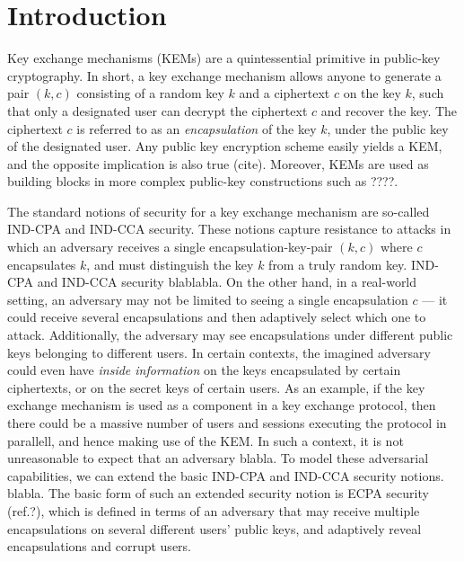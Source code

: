 
\section{Introduction}

Key exchange mechanisms (KEMs) are a quintessential primitive in public-key cryptography.
In short, a key exchange mechanism allows anyone to generate a pair \((k,c)\)
consisting of a random key \(k\) and a ciphertext \(c\) on the key \(k\),
such that only a designated user can decrypt the ciphertext \(c\) and recover the key.
The ciphertext \(c\) is referred to as an \emph{encapsulation} of the key \(k\),
under the public key of the designated user.
Any public key encryption scheme easily yields a KEM, and the opposite implication is also true (cite).
Moreover, KEMs are used as building blocks in more complex public-key constructions such as ????.

The standard notions of security for a key exchange mechanism are so-called IND-CPA and IND-CCA security.
These notions capture resistance to attacks in which an adversary receives a single
encapsulation-key-pair \((k,c)\) where \(c\) encapsulates \(k\),
and must distinguish the key \(k\) from a truly random key.
IND-CPA and IND-CCA security blablabla.
On the other hand, in a real-world setting,
an adversary may not be limited to seeing a single encapsulation \(c\)
--- it could receive several encapsulations and then adaptively select which one to attack.
Additionally, the adversary may see encapsulations under different public keys belonging to different users.
In certain contexts, the imagined adversary could even have \emph{inside information}
on the keys encapsulated by certain ciphertexts, or on the secret keys of certain users.
As an example, if the key exchange mechanism is used as a component in a key exchange protocol,
then there could be a massive number of users and sessions executing the protocol in parallell,
and hence making use of the KEM.
In such a context, it is not unreasonable to expect that an adversary blabla.
To model these adversarial capabilities,
we can extend the basic IND-CPA and IND-CCA security notions.
blabla.
The basic form of such an extended security notion is ECPA security (ref.?),
which is defined in terms of an adversary that may receive multiple encapsulations
on several different users' public keys, and adaptively reveal encapsulations and corrupt users.

